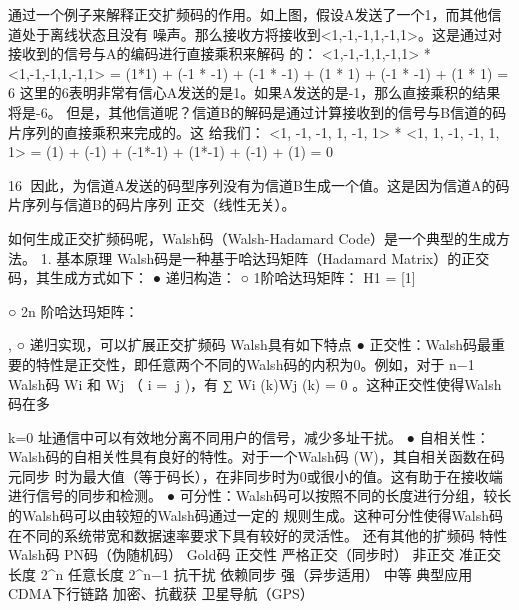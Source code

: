 通过一个例子来解释正交扩频码的作用。如上图，假设A发送了一个1，而其他信道处于离线状态且没有
噪声。那么接收方将接收到<1,-1,-1,1,-1,1>。这是通过对接收到的信号与A的编码进行直接乘积来解码
的：
<1,-1,-1,1,-1,1> * <1,-1,-1,1,-1,1>
= (1*1) + (-1 * -1) + (-1 * -1) + (1 * 1) + (-1 * -1) + (1 * 1) = 6
这里的6表明非常有信心A发送的是1。如果A发送的是-1，那么直接乘积的结果将是-6。
但是，其他信道呢？信道B的解码是通过计算接收到的信号与B信道的码片序列的直接乘积来完成的。这
给我们：
<1, -1, -1, 1, -1, 1> * <1, 1, -1, -1, 1, 1> = (1) + (-1) + (-1*-1) + (1*-1) + (-1) + (1) = 0


                                                                                           16
因此，为信道A发送的码型序列没有为信道B生成一个值。这是因为信道A的码片序列与信道B的码片序列
正交（线性无关）。

如何生成正交扩频码呢，Walsh码（Walsh-Hadamard Code）是一个典型的生成方法。
1. 基本原理
Walsh码是一种基于哈达玛矩阵（Hadamard Matrix）的正交码，其生成方式如下：
  ● 递归构造：
     ○ 1阶哈达玛矩阵： H1 = [1]
                      ​   ​




     ○ 2n 阶哈达玛矩阵：




                                            ,
    ○   递归实现，可以扩展正交扩频码
Walsh具有如下特点
 ● 正交性：Walsh码最重要的特性是正交性，即任意两个不同的Walsh码的内积为0。例如，对于
                                n−1
    Walsh码 Wi 和 Wj （ i = j )，有 ∑ Wi (k)Wj (k) = 0 。这种正交性使得Walsh码在多
           ​      ​             ​   ​   ​




                                k=0
    址通信中可以有效地分离不同用户的信号，减少多址干扰。
 ● 自相关性：Walsh码的自相关性具有良好的特性。对于一个Walsh码 (W)，其自相关函数在码元同步
    时为最大值（等于码长），在非同步时为0或很小的值。这有助于在接收端进行信号的同步和检测。
 ● 可分性：Walsh码可以按照不同的长度进行分组，较长的Walsh码可以由较短的Walsh码通过一定的
    规则生成。这种可分性使得Walsh码在不同的系统带宽和数据速率要求下具有较好的灵活性。
还有其他的扩频码
 特性               Walsh码            PN码（伪随机码）          Gold码
 正交性              严格正交（同步时） 非正交                        准正交
 长度               2^n               任意长度               2^n−1
 抗干扰              依赖同步              强（异步适用）            中等
 典型应用             CDMA下行链路          加密、抗截获             卫星导航（GPS）



